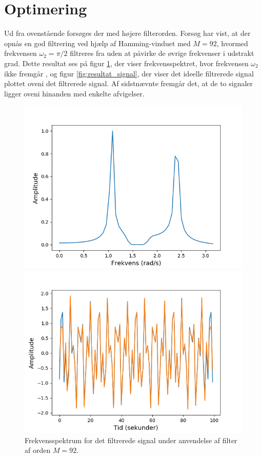 \section{Optimering}
Ud fra ovenstående forsøges der med højere filterorden. Forsøg har vist, at der opnås en god filtrering ved hjælp af Hamming-vinduet med $M=92$, hvormed frekvensen $\omega_2 = \pi/2$ filtreres fra uden at påvirke de øvrige frekvenser i udstrakt grad. Dette resultat ses på figur \ref{fig:resultat_freq}, der viser frekvensspektret, hvor frekvensen $\omega_2$ ikke fremgår , og figur \ref{fig:resultat_signal}, der viser det ideelle filtrerede signal plottet oveni det filtrerede signal. Af sidstnævnte fremgår det, at de to signaler ligger oveni hinanden med enkelte afvigelser.
\begin{figure}[H]
\begin{minipage}{0.49\textwidth}
\centering
\includegraphics[width=\textwidth]{figures/sf1.png}
\caption{Frekvensspektrum for det filtrerede signal under anvendelse af filter af orden $M=92$.}
\label{fig:resultat_freq}
\end{minipage}
\begin{minipage}{0.49\textwidth}
\centering
\includegraphics[width=\textwidth]{figures/sf.png}

\end{minipage}
\end{figure}

